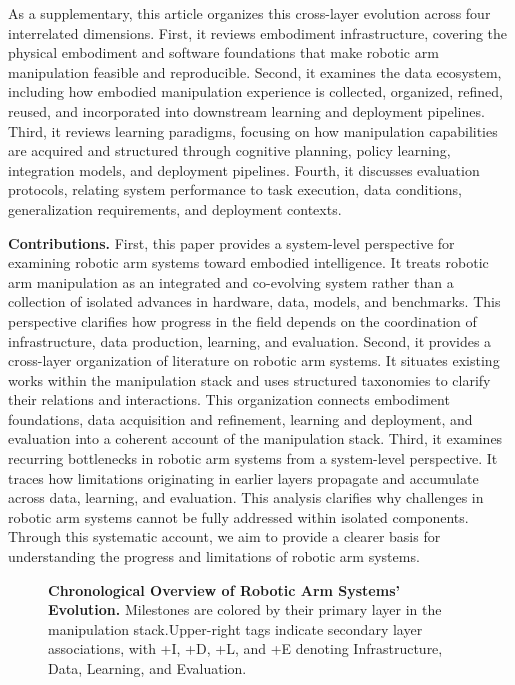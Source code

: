 \documentclass[acmsmall,screen,review]{acmart}
\begin{document}
As a supplementary, this article organizes this cross-layer evolution across four interrelated dimensions.
First, it reviews embodiment infrastructure, covering the physical embodiment and software foundations that make robotic arm manipulation feasible and reproducible.
Second, it examines the data ecosystem, including how embodied manipulation experience is collected, organized, refined, reused, and incorporated into downstream learning and deployment pipelines.
Third, it reviews learning paradigms, focusing on how manipulation capabilities are acquired and structured through cognitive planning, policy learning, integration models, and deployment pipelines.
Fourth, it discusses evaluation protocols, relating system performance to task execution, data conditions, generalization requirements, and deployment contexts.

\textbf{Contributions.}
First, this paper provides a system-level perspective for examining robotic arm systems toward embodied intelligence.
It treats robotic arm manipulation as an integrated and co-evolving system rather than a collection of isolated advances in hardware, data, models, and benchmarks.
This perspective clarifies how progress in the field depends on the coordination of infrastructure, data production, learning, and evaluation.
Second, it provides a cross-layer organization of literature on robotic arm systems. 
It situates existing works within the manipulation stack and uses structured taxonomies to clarify their relations and interactions.
This organization connects embodiment foundations, data acquisition and refinement, learning and deployment, and evaluation into a coherent account of the manipulation stack.
Third, it examines recurring bottlenecks in robotic arm systems from a system-level perspective.
It traces how limitations originating in earlier layers propagate and accumulate across data, learning, and evaluation.
This analysis clarifies why challenges in robotic arm systems cannot be fully addressed within isolated components.
Through this systematic account, we aim to provide a clearer basis for understanding the progress and limitations of robotic arm systems.

\begin{figure}[!t]
  \centering
  \resizebox{\textwidth}{!}{%
    \begingroup
    \endlinechar=-1\relax
    \endgroup
  }
  \caption{\textbf{Chronological Overview of Robotic Arm Systems' Evolution.} Milestones are colored by their primary layer in the manipulation stack.Upper-right tags indicate secondary layer associations, with +I, +D, +L, and +E denoting Infrastructure, Data, Learning, and Evaluation.}
  \label{fig:cross_layer_timeline}
\end{figure}
\end{document}
